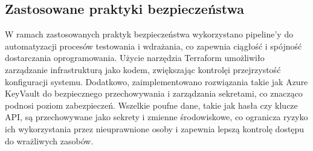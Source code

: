\subsection{Zastosowane praktyki bezpieczeństwa}
W ramach zastosowanych praktyk bezpieczeństwa wykorzystano pipeline'y do automatyzacji procesów testowania i wdrażania, co zapewnia ciągłość i spójność dostarczania oprogramowania. Użycie narzędzia Terraform umożliwiło zarządzanie infrastrukturą jako kodem, zwiększając kontrolę\linebreak i przejrzystość konfiguracji systemu. Dodatkowo, zaimplementowano rozwiązania takie jak Azure KeyVault do bezpiecznego przechowywania i zarządzania sekretami, co znacząco podnosi poziom zabezpieczeń. Wszelkie poufne dane, takie jak hasła czy klucze API, są przechowywane jako sekrety i zmienne środowiskowe, co ogranicza ryzyko ich wykorzystania przez nieuprawnione osoby i zapewnia lepszą kontrolę dostępu do wrażliwych zasobów.